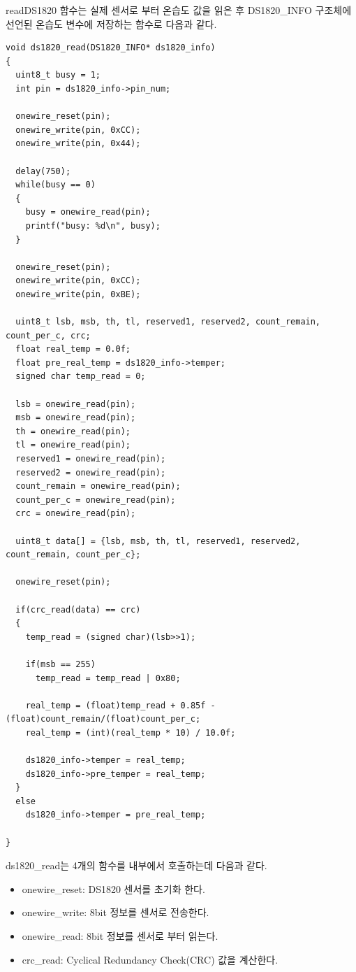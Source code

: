 \documentclass[11pt
  , a4paper
  , article
  , oneside
]{memoir}
\begin{document}
readDS1820 함수는 실제 센서로 부터 온습도 값을 읽은 후 DS1820\_INFO 구조체에 선언된 온습도 변수에 저장하는 
함수로 다음과 같다. 
\begin{lstlisting}[style=termstylenumber, caption={Editing \texttt{/etc/fai/NFSROOT}}, label={list:nfsroot-file}]
void ds1820_read(DS1820_INFO* ds1820_info)
{
  uint8_t busy = 1;
  int pin = ds1820_info->pin_num;

  onewire_reset(pin);
  onewire_write(pin, 0xCC);
  onewire_write(pin, 0x44);

  delay(750);
  while(busy == 0)
  {
    busy = onewire_read(pin);
    printf("busy: %d\n", busy);
  }

  onewire_reset(pin);
  onewire_write(pin, 0xCC);
  onewire_write(pin, 0xBE);

  uint8_t lsb, msb, th, tl, reserved1, reserved2, count_remain, count_per_c, crc;
  float real_temp = 0.0f;
  float pre_real_temp = ds1820_info->temper;
  signed char temp_read = 0;

  lsb = onewire_read(pin);
  msb = onewire_read(pin);
  th = onewire_read(pin);
  tl = onewire_read(pin);
  reserved1 = onewire_read(pin);
  reserved2 = onewire_read(pin);
  count_remain = onewire_read(pin);
  count_per_c = onewire_read(pin);
  crc = onewire_read(pin);

  uint8_t data[] = {lsb, msb, th, tl, reserved1, reserved2, count_remain, count_per_c};

  onewire_reset(pin);

  if(crc_read(data) == crc)
  {
    temp_read = (signed char)(lsb>>1);

    if(msb == 255)
      temp_read = temp_read | 0x80;

    real_temp = (float)temp_read + 0.85f - (float)count_remain/(float)count_per_c;
    real_temp = (int)(real_temp * 10) / 10.0f;

    ds1820_info->temper = real_temp;
    ds1820_info->pre_temper = real_temp;
  }
  else
    ds1820_info->temper = pre_real_temp;

}
\end{lstlisting}
ds1820\_read는 4개의 함수를 내부에서 호출하는데 다음과 같다.
\begin{itemize}
\item onewire\_reset: DS1820 센서를 초기화 한다.
\item onewire\_write: 8bit 정보를 센서로 전송한다.
\item onewire\_read: 8bit 정보를 센서로 부터 읽는다.
\item crc\_read: Cyclical Redundancy Check(CRC) 값을 계산한다.
\end{itemize}
\end{document}

